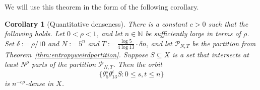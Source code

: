\documentclass[11pt]{amsart}
\newtheorem{corollary}[lemma]{Corollary}
\theoremstyle{definition}
\begin{document}
We will use this theorem in the form of the following corollary.

\begin{corollary}[Quantitative denseness]\label{cor:quantitativedenseness}
There is a constant $c>0$ such that the following holds.  Let $0<\rho<1$, and let $n \in \mathbb{N}$ be sufficiently large in terms of $\rho$.  Set $\delta:=\rho/10$ and $N:=5^n$ and $T:=\frac{\log 5}{4 \log 13} \cdot \delta n$, and let $\mathcal{P}_{N,T}$ be the partition from Theorem~\ref{thm:entropyweirdpartition}.  Suppose $S \subseteq X$ is a set that intersects at least $N^\rho$ parts of the partition $\mathcal{P}_{N,T}$.  Then the orbit
$$\{\theta_5^s \theta_{13}^t S: 0 \le s,t \le n\}$$
is $n^{-c\rho}$-dense in $X$.
\end{corollary}
\end{document}
